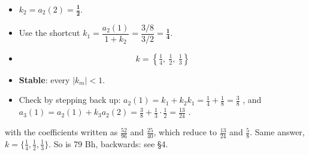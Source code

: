 \begin{itemize}
  \item $k_2=a_2(2)=\mathbf{\tfrac12}$.
  \item Use the shortcut $k_1=\dfrac{a_2(1)}{1+k_2}=\dfrac{3/8}{3/2}=\mathbf{\tfrac14}$.
  \item[] \[ \boxed{k=\left\{\tfrac14,\ \tfrac12,\ \tfrac13\right\}} \]
  \item \textbf{Stable}: every $|k_m|<1$.
  \item Check by stepping back up: $a_2(1)=k_1+k_2k_1=\tfrac14+\tfrac18=\tfrac38$
        \checkmark, and $a_3(1)=a_2(1)+k_3a_2(2)=\tfrac38+\tfrac13\cdot\tfrac12
        =\tfrac{13}{24}$ \checkmark.
\end{itemize}

{\color{sub}\footnotesize {} with the coefficients
written as $\tfrac{52}{96}$ and $\tfrac{25}{40}$, which reduce to $\tfrac{13}{24}$ and
$\tfrac58$. Same answer, $k=\{\tfrac14,\tfrac12,\tfrac13\}$. So is 79 Bh, backwards:
see \S4.}

